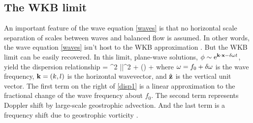 \documentclass{jfm}
\begin{document}
\subsection{The WKB limit}
An important feature of the wave equation \eqref{waves} is that no horizontal scale
separation of scales between waves and balanced flow is assumed. In other words,
the wave equation \eqref{waves} isn't host to the WKB approximation
\citep[e.g., ][]{young_benjelloul1997}. But the WKB limit can be easily recovered.
In this limit, plane-wave solutions, $\phi \sim {\rm e}^{\mathbf{k} \cdot \mathbf{x} -  \delta\omega t}$,
yield the dispersion relationship
\beq\label{disp1}
 = \half \lambda^2 |\kb|^2 + \zhb\cdot(\kb\times\grad\psi)
 + \lap\psi\com
\eeq
where $\omega = f_0 + \delta\omega$ is the wave frequency, $\mathbf{k} = (k,l)$ is the horizontal
wavevector, and $\hat{\mathbf{z}}$ is the vertical unit vector. The first term on the right
of \eqref{disp1} is a linear approximation to the fractional change of the wave
frequency about $f_0$. The second term represents Doppler shift by large-scale
geostrophic advection. And the last term is a frequency shift due to geostrophic
vorticity \citep{kunze1985,young_benjelloul1997}.
\end{document}
